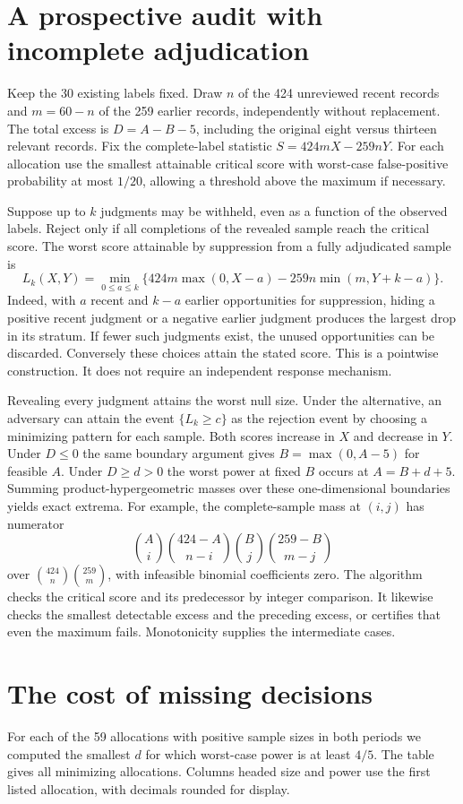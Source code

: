 \documentclass[11pt]{article}
\begin{document}
\section{A prospective audit with incomplete adjudication}
Keep the 30 existing labels fixed. Draw $n$ of the 424 unreviewed recent records and $m=60-n$ of the 259 earlier records, independently without replacement. The total excess is $D=A-B-5$, including the original eight versus thirteen relevant records. Fix the complete-label statistic $S=424mX-259nY$. For each allocation use the smallest attainable critical score with worst-case false-positive probability at most $1/20$, allowing a threshold above the maximum if necessary.

Suppose up to $k$ judgments may be withheld, even as a function of the observed labels. Reject only if all completions of the revealed sample reach the critical score. The worst score attainable by suppression from a fully adjudicated sample is
\[
 L_k(X,Y)=\min_{0\le a\le k}
 \{424m\max(0,X-a)-259n\min(m,Y+k-a)\}.
\]
Indeed, with $a$ recent and $k-a$ earlier opportunities for suppression, hiding a positive recent judgment or a negative earlier judgment produces the largest drop in its stratum. If fewer such judgments exist, the unused opportunities can be discarded. Conversely these choices attain the stated score. This is a pointwise construction. It does not require an independent response mechanism.

Revealing every judgment attains the worst null size. Under the alternative, an adversary can attain the event $\{L_k\ge c\}$ as the rejection event by choosing a minimizing pattern for each sample. Both scores increase in $X$ and decrease in $Y$. Under $D\le0$ the same boundary argument gives $B=\max(0,A-5)$ for feasible $A$. Under $D\ge d>0$ the worst power at fixed $B$ occurs at $A=B+d+5$. Summing product-hypergeometric masses over these one-dimensional boundaries yields exact extrema. For example, the complete-sample mass at $(i,j)$ has numerator
\[
 {A\choose i}{424-A\choose n-i}{B\choose j}{259-B\choose m-j}
\]
over $\binom{424}{n}\binom{259}{m}$, with infeasible binomial coefficients zero. The algorithm checks the critical score and its predecessor by integer comparison. It likewise checks the smallest detectable excess and the preceding excess, or certifies that even the maximum fails. Monotonicity supplies the intermediate cases.
\newpage
\section{The cost of missing decisions}
For each of the 59 allocations with positive sample sizes in both periods we computed the smallest $d$ for which worst-case power is at least $4/5$. The table gives all minimizing allocations. Columns headed size and power use the first listed allocation, with decimals rounded for display.
\end{document}
